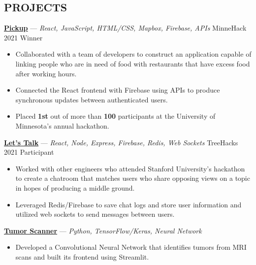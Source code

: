 \documentclass[11pt]{res}
\begin{document}
\begin{footnotesize}
\begin{resume}
\begin{small}
\section{PROJECTS}
\end{small} 
\vspace{.5mm}
\href{https://devpost.com/software/pickup-7b8yhx}{\textbf{Pickup}} — {\sl React, JavaScript, HTML/CSS, Mapbox, Firebase, APIs} \hfill MinneHack 2021 Winner\vspace{-4.5mm}
\begin{itemize}[leftmargin=6.25mm] \itemsep -2pt 
\item Collaborated with a team of developers to construct an application capable of linking people who are in need of food with restaurants that have excess food after working hours.
\vspace{1.30mm}
\item Connected the React frontend with Firebase using APIs to produce synchronous updates between authenticated users.
\vspace{1.30mm}
\item Placed \textbf{1st} out of more than \textbf{100} participants at the University of Minnesota's annual hackathon. 
\end{itemize}
\vspace{-2.5mm}
\href{https://devpost.com/software/let-s-talk-7si84k}{\textbf{Let's Talk}} — {\sl React, Node, Express, Firebase, Redis, Web Sockets} \hfill TreeHacks 2021 Participant\vspace{-4.5mm}
\begin{itemize}[leftmargin=6.25mm] \itemsep -2pt 
\item Worked with other engineers who attended Stanford University's hackathon to create a chatroom that matches users who share opposing views on a topic in hopes of producing a middle ground. 
\vspace{1.30mm}
\item Leveraged Redis/Firebase to save chat logs and store user information and utilized web sockets to send messages between users. 
\end{itemize}
\vspace{-2.5mm}
\href{https://github.com/CharlesShi12/AI_Tumor_Scanner}{\textbf{Tumor Scanner}} — {\sl Python, TensorFlow/Keras, Neural Network}\vspace{-4.5mm}
\begin{itemize}[leftmargin=6.25mm] \itemsep -2pt 
\item Developed a Convolutional Neural Network that identifies tumors from MRI scans and built its frontend using Streamlit.

\end{itemize}
\end{resume}
\end{footnotesize}
\end{document}
